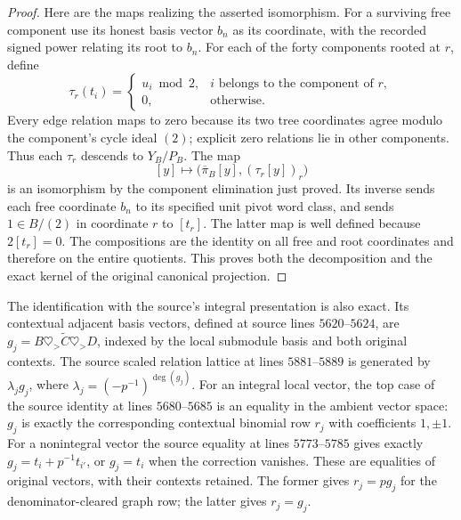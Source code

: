 \begin{proof}
Here are the maps realizing the asserted isomorphism.
For a surviving free component use its honest basis
vector $b_n$ as its coordinate, with the recorded signed
power relating its root to $b_n$. For each of the forty
components rooted at $r$, define
\[
 \tau_r(t_i)=
 \begin{cases}
    u_i\bmod 2,&i\text{ belongs to the component of }r,\\
    0,&\text{otherwise}.
 \end{cases}
\]
Every edge relation maps to zero because its two tree
coordinates agree modulo the component's cycle ideal
$(2)$; explicit zero relations lie in other components.
Thus each $\tau_r$ descends to $Y_B/P_B$.
The map
\[
 [y]\longmapsto
 \bigl(\overline\pi_B[y],(\tau_r[y])_r\bigr)
\]
is an isomorphism by the component elimination just
proved. Its inverse sends each free coordinate $b_n$
to its specified unit pivot word class, and sends
$1\in B/(2)$ in coordinate $r$ to $[t_r]$.
The latter map is well defined because $2[t_r]=0$.
The compositions are the identity on all free and root
coordinates and therefore on the entire quotients.
This proves both the decomposition and the exact kernel
of the original canonical projection.
\end{proof}

The identification with the source's integral
presentation is also exact. Its contextual adjacent
basis vectors, defined at source lines $5620$--$5624$,
are $g_j=B\mathbin{\heartsuit_{\!>}}\widetilde C
\mathbin{\heartsuit_{\!>}}D$, indexed by the local
submodule basis and both original contexts. The source
scaled relation lattice at lines $5881$--$5889$ is
generated by $\lambda_jg_j$, where
$\lambda_j=(-p^{-1})^{\deg(g_j)}$. For an integral
local vector, the top case of the source identity at
lines $5680$--$5685$ is an equality in the ambient
vector space: $g_j$ is exactly the corresponding
contextual binomial row $r_j$ with coefficients
$1,\pm1$. For a nonintegral vector the source equality
at lines $5773$--$5785$ gives exactly
$g_j=t_i+p^{-1}t_{i'}$, or $g_j=t_i$ when the correction
vanishes. These are equalities of original vectors,
with their contexts retained. The former gives
$r_j=pg_j$ for the denominator-cleared graph row;
the latter gives $r_j=g_j$.

